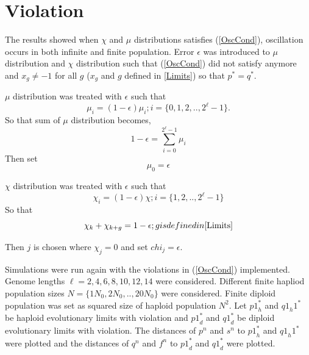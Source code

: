 \section{Violation}
The results showed when $\chi$ and $\mu$ distributions satisfies (\ref{OscCond}), oscillation occurs in both infinite and finite population. 
Error $\epsilon$ was introduced to $\mu$ distribution and $\chi$ distribution such that (\ref{OscCond}) did not satisfy anymore and 
$x_g \neq −1$ for all $g$ ($x_g$ and $g$ defined in \ref{Limits}) so that $p^\ast = q^\ast$.

$\mu$ distribution was treated with $\epsilon$ such that
\[
\mu_i = (1-\epsilon) \mu_i ; i = \{0, 1, 2,.., 2^{\ell}-1\}.
\]
So that sum of $\mu$ distribution becomes, 
\[
1-\epsilon = \sum \limits_{i=0}^{2^{\ell}-1} \mu_i
\]
Then set
\[
\mu_0 = \epsilon
\]

$\chi$ distribution was treated with $\epsilon$ such that
\[
\chi_i = (1-\epsilon) \chi ; i = \{1, 2,.., 2^{\ell}-1\} 
\]
So that 
\[
\chi_k + \chi_{k+ g} = 1-\epsilon ; g is defined in \ref{Limits}
\]

Then $j$ is chosen where $\chi_j = 0$ and set $chi_j = \epsilon$. \newline

Simulations were run again with the violations in (\ref{OscCond}) implemented. Genome lengths $\ell = {2, 4, 6, 8, 10, 12, 14}$ were considered. 
Different finite hapliod population sizes $N = \{1N_0, 2N_0,.., 20N_0\}$ were considered. Finite diploid population was set as 
squared size of haploid population $N^2$.\newline
Let ${p1}_h^{\ast}$ and ${q1}_h1^{\ast}$ be haploid evolutionary limits with violation and ${p1}_d^{\ast}$ and ${q1}_d^{\ast}$ be diploid 
evolutionary limits with violation. The distances of ${p}^n$ and $s^n$ to ${p1}_h^{\ast}$ and ${q1}_h1^{\ast}$ were plotted and the distances of 
$q^n$ and $f^n$ to ${p1}_d^{\ast}$ and ${q1}_d^{\ast}$ were plotted.








 
